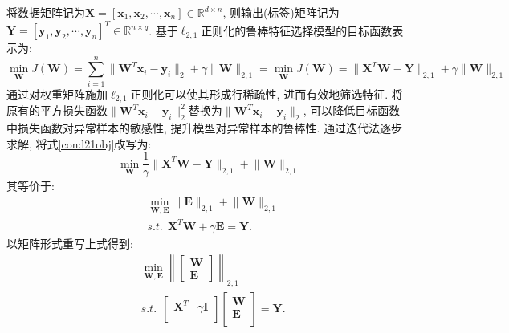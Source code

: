 \documentclass[lang=cn,10pt]{gorgeousnbook}
\numberwithin{equation}{section}%
\numberwithin{figure}{section}%
\begin{document}
将数据矩阵记为$\mathbf{X}=\left[ \mathbf{x}_1,\mathbf{x}_2,\cdots ,\mathbf{x}_n \right]\in\mathbb{R}^{d\times n} $, 则输出(标签)矩阵记为$\mathbf{Y}=\left[ \mathbf{y}_1,\mathbf{y}_2,\cdots ,\mathbf{y}_n \right]^T \in\mathbb{R}^{n\times q} $. 基于$\ell_{2,1}$正则化的鲁棒特征选择模型的目标函数表示为:
 \begin{equation}
\min_{\mathbf{W}}J\left( \mathbf{W} \right) =\sum_{i=1}^n{\lVert \mathbf{W}^T\mathbf{x}_i-\mathbf{y}_i \rVert _{2}+\gamma \lVert \mathbf{W} \rVert _{2,1}}= \min_{\mathbf{W}}J\left( \mathbf{W} \right) =\lVert \mathbf{X}^T\mathbf{W}-\mathbf{Y} \rVert _{2,1}+\gamma \lVert \mathbf{W} \rVert _{2,1} \label{con:l21obj}
\end{equation}
通过对权重矩阵施加$\ell_{2,1}$正则化可以使其形成行稀疏性, 进而有效地筛选特征. 将原有的平方损失函数$\lVert \mathbf{W}^T\mathbf{x}_i-\mathbf{y}_i \rVert _{2}^{2}$替换为$\lVert \mathbf{W}^T\mathbf{x}_i-\mathbf{y}_i \rVert _{2}$, 可以降低目标函数中损失函数对异常样本的敏感性, 提升模型对异常样本的鲁棒性. 通过迭代法逐步求解, 将式\eqref{con:l21obj}改写为:
 \begin{equation}
\min_{\mathbf{W}}\frac{1}{\gamma}\lVert \mathbf{X}^T\mathbf{W}-\mathbf{Y} \rVert _{2,1}+\lVert \mathbf{W} \rVert _{2,1} \label{con:4.2.3}
\end{equation}
其等价于:
 \begin{equation}
 \begin{aligned}
&\min_{\mathbf{W,E}}\lVert \mathbf{E} \rVert _{2,1}+\lVert \mathbf{W} \rVert _{2,1}\\
&s.t.\ \ \mathbf{X}^T\mathbf{W}+\gamma \mathbf{E}=\mathbf{Y.}
 \end{aligned}
\end{equation}
以矩阵形式重写上式得到:
\begin{equation}
\begin{aligned}
&\min _{\mathbf{W}, \mathbf{E}}\left\|\left[\begin{array}{c}
\mathbf{W} \\
\mathbf{E}
\end{array}\right]\right\|_{2,1}\\
&s.t.\ \ \left[ \begin{matrix}
	\mathbf{X}^T&		\gamma \mathbf{I}\\
\end{matrix} \right] \left[ \begin{array}{c}
	\mathbf{W}\\
	\mathbf{E}\\
\end{array} \right] =\mathbf{Y.} \label{con:l21obj2}
\end{aligned}
\end{equation}
\end{document}
